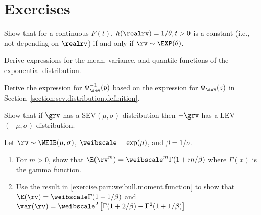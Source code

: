 \section*{Exercises}


\begin{exercise}
Show that for a continuous $F(t)$,
$h(\realrv) = 1/\theta, t > 0$ is a constant (i.e., not depending
on $\realrv$) if and only if $\rv \sim \EXP(\theta)$.
\end{exercise}



\begin{exercise}
Derive expressions for the mean, variance,
and quantile functions of the exponential distribution.
\end{exercise}


\begin{exercise}
Derive the expression for $\Phi_{\sev}^{-1}(p)$
based on the expression for 
$\Phi_{\sev}(z)$ in
Section~\ref{section:sev.distribution.definition}.
\end{exercise}


\begin{exercise}
 Show that if $\grv$ has a SEV$(\mu, \sigma)$ distribution then
$-\grv$ has a LEV$(-\mu, \sigma)$ distribution.
\end{exercise}

\begin{exercise1}
Let $\rv \sim \WEIB(\mu,\sigma)$, $\weibscale=\exp(\mu)$,
and $\beta=1/\sigma$.
\begin{enumerate}
\item 
\label{exercise.part:weibull.moment.function}
For $m>0$, show that	 
$
\E(\rv^{m} )= \weibscale^{m} \Gamma(1+m/\beta)
$
where $\Gamma(x)$
is the gamma function.
\item Use the result in 
\ref{exercise.part:weibull.moment.function}
to show that $
\E(\rv)=\weibscale \Gamma(1+1/\beta)
$ and $
\var(\rv)=\weibscale^{2} 		 \left [
\Gamma(1+2/\beta)-\Gamma^{2}(1+1/\beta) \right ].
$
\end{enumerate}
\end{exercise1}


